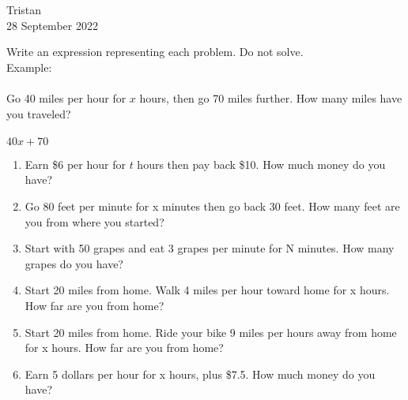 \documentclass[14pt]{extarticle} %
\begin{document}
\hfill Tristan\\
\null\hfill 28 September 2022

\vspace{10mm}

Write an expression representing each problem. Do not solve.\\

Example:\\\\
Go 40 miles per hour for $x$ hours, then go 70 miles further. How many miles have you traveled?\\\\
\vspace{10mm}
$40x+70$\\
\vspace{5mm}

\begin{enumerate}[label=\Alph*.), itemsep=\fill]
\item Earn \$6 per hour for $t$ hours then pay back \$10. How much money do you have?
\item Go 80 feet per minute for x minutes then go back 30 feet. How many feet are you from where you started?
\item Start with 50 grapes and eat 3 grapes per minute for N minutes. How many grapes do you have?
\vfill\clearpage
\item  Start 20 miles from home. Walk 4 miles per hour toward home for x hours. How far are you from home?
\item Start 20 miles from home. Ride your bike 9 miles per hours away from home for x hours. How far are you from home?
\item Earn 5 dollars per hour for x hours, plus \$7.5. How much money do you have?
\vfill\end{enumerate}
\end{document}
